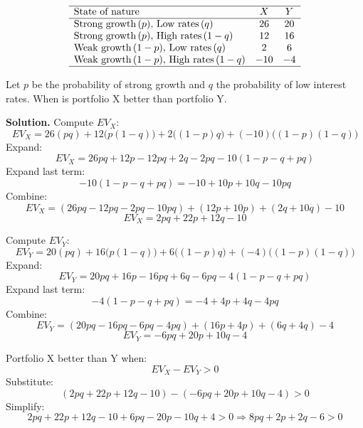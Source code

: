 \begin{ExamProblems}
		\[
		\begin{array}{lcc}
			\hline
			\text{State of nature} & X & Y \\
			\hline
			\text{Strong growth}\,(p),\,\text{Low rates}\,(q) & 26 & 20 \\
			\text{Strong growth}\,(p),\,\text{High rates}\,(1-q) & 12 & 16 \\
			\text{Weak growth}\,(1-p),\,\text{Low rates}\,(q) & 2 & 6 \\
			\text{Weak growth}\,(1-p),\,\text{High rates}\,(1-q) & -10 & -4 \\
			\hline
		\end{array}
		\]
		
		Let \(p\) be the probability of strong growth and \(q\) the probability of low interest rates.  
		When is portfolio X better than portfolio Y.
		
		\textbf{Solution.}
		Compute \(EV_X\):
		\[
		EV_X=26(pq)+12\bigl(p(1-q)\bigr)+2\bigl((1-p)q\bigr)+(-10)\bigl((1-p)(1-q)\bigr)
		\]
		Expand:
		\[
		EV_X=26pq + 12p - 12pq + 2q - 2pq - 10(1-p-q+pq)
		\]
		Expand last term:
		\[
		-10(1-p-q+pq)=-10 + 10p + 10q - 10pq
		\]
		Combine:
		\[
		EV_X=(26pq-12pq-2pq-10pq) + (12p+10p) + (2q+10q) - 10
		\]
		\[
		EV_X=2pq + 22p + 12q - 10
		\]
		
		Compute \(EV_Y\):
		\[
		EV_Y=20(pq)+16\bigl(p(1-q)\bigr)+6\bigl((1-p)q\bigr)+(-4)\bigl((1-p)(1-q)\bigr)
		\]
		Expand:
		\[
		EV_Y=20pq + 16p - 16pq + 6q - 6pq - 4(1-p-q+pq)
		\]
		Expand last term:
		\[
		-4(1-p-q+pq)=-4 + 4p + 4q - 4pq
		\]
		Combine:
		\[
		EV_Y=(20pq-16pq-6pq-4pq) + (16p+4p) + (6q+4q) - 4
		\]
		\[
		EV_Y=-6pq + 20p + 10q - 4
		\]
		
		Portfolio X better than Y when:
		\[
		EV_X-EV_Y>0
		\]
		Substitute:
		\[
		(2pq+22p+12q-10)-(-6pq+20p+10q-4)>0
		\]
		Simplify:
		\[
		2pq+22p+12q-10+6pq-20p-10q+4>0
		\Rightarrow 8pq+2p+2q-6>0
		\]
		
	\end{ExamProblems}
	

